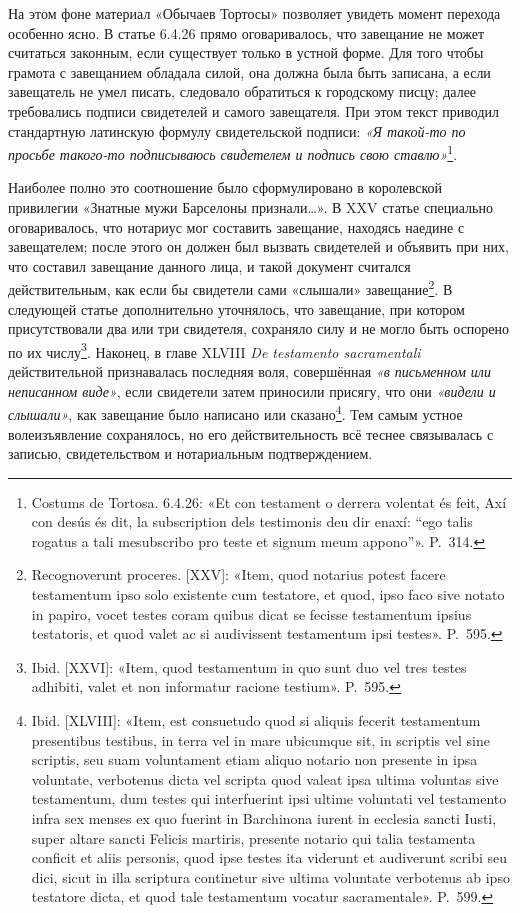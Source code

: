 На этом фоне материал «Обычаев Тортосы» позволяет увидеть момент перехода особенно ясно. В статье 6.4.26 прямо оговаривалось, что завещание не может считаться законным, если существует только в устной форме. Для того чтобы грамота с завещанием обладала силой, она должна была быть записана, а если завещатель не умел писать, следовало обратиться к городскому писцу; далее требовались подписи свидетелей и самого завещателя. При этом текст приводил стандартную латинскую формулу свидетельской подписи: \emph{«Я такой-то по просьбе такого-то подписываюсь свидетелем и подпись свою ставлю»}\footnote{Costums de Tortosa. 6.4.26: «Et con testament o derrera volentat és feit, Axí con desús és dit, la subscription dels testimonis deu dir enaxí: “ego talis rogatus a tali mesubscribo pro teste et signum meum appono”». P.~314.}.

Наиболее полно это соотношение было сформулировано в королевской привилегии «Знатные мужи Барселоны признали…». В XXV статье специально оговаривалось, что нотариус мог составить завещание, находясь наедине с завещателем; после этого он должен был вызвать свидетелей и объявить при них, что составил завещание данного лица, и такой документ считался действительным, как если бы свидетели сами «слышали» завещание\footnote{Recognoverunt proceres. [XXV]: «Item, quod notarius potest facere testamentum ipso solo existente cum testatore, et quod, ipso faco sive notato in papiro, vocet testes coram quibus dicat se fecisse testamentum ipsius testatoris, et quod valet ac si audivissent testamentum ipsi testes». P.~595.}. В следующей статье дополнительно уточнялось, что завещание, при котором присутствовали два или три свидетеля, сохраняло силу и не могло быть оспорено по их числу\footnote{Ibid. [XXVI]: «Item, quod testamentum in quo sunt duo vel tres testes adhibiti, valet et non informatur racione testium». P.~595.}. Наконец, в главе XLVIII \emph{De testamento sacramentali} действительной признавалась последняя воля, совершённая \emph{«в письменном или неписанном виде»}, если свидетели затем приносили присягу, что они\emph{ «видели и слышали»}, как завещание было написано или сказано\footnote{Ibid. [XLVIII]: «Item, est consuetudo quod si aliquis fecerit testamentum presentibus testibus, in terra vel in mare ubicumque sit, in scriptis vel sine scriptis, seu suam voluntament etiam aliquo notario non presente in ipsa voluntate, verbotenus dicta vel scripta quod valeat ipsa ultima voluntas sive testamentum, dum testes qui interfuerint ipsi ultime voluntati vel testamento infra sex menses ex quo fuerint in Barchinona iurent in ecclesia sancti Iusti, super altare sancti Felicis martiris, presente notario qui talia testamenta conficit et aliis personis, quod ipse testes ita viderunt et audiverunt scribi seu dici, sicut in illa scriptura continetur sive ultima voluntate verbotenus ab ipso testatore dicta, et quod tale testamentum vocatur sacramentale». P.~599.}. Тем самым устное волеизъявление сохранялось, но его действительность всё теснее связывалась с записью, свидетельством и нотариальным подтверждением.

